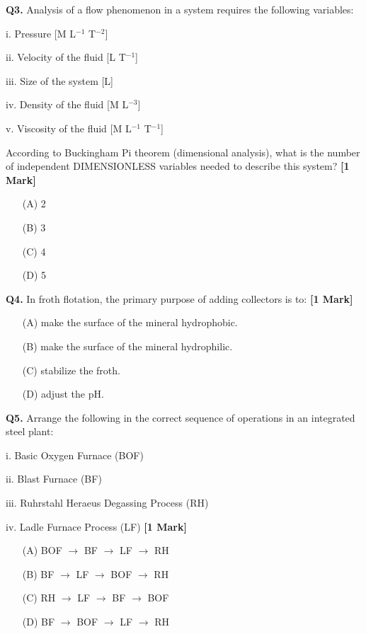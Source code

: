 \documentclass[11pt]{article}
\newcommand{\questiona}[2]{
    \noindent\textbf{Q#2.} #1 \hfill \textbf{[1 Mark]}
}
\begin{document}
\questiona{Analysis of a flow phenomenon in a system requires the following variables:  

i. Pressure [M L\(^{-1}\) T\(^{-2}\)]  

ii. Velocity of the fluid [L T\(^{-1}\)]  

iii. Size of the system [L]  

iv. Density of the fluid [M L\(^{-3}\)]  

v. Viscosity of the fluid [M L\(^{-1}\) T\(^{-1}\)]  

According to Buckingham Pi theorem (dimensional analysis), what is the number of independent DIMENSIONLESS variables needed to describe this system?}{3}
\begin{enumerate}
    \item[(A)] 2  
    \item[(B)] 3  
    \item[(C)] 4  
    \item[(D)] 5  
\end{enumerate}
\vspace{0.5cm}

\questiona{In froth flotation, the primary purpose of adding collectors is to:}{4}
\begin{enumerate}
    \item[(A)] make the surface of the mineral hydrophobic.  
    \item[(B)] make the surface of the mineral hydrophilic.  
    \item[(C)] stabilize the froth.  
    \item[(D)] adjust the pH.  
\end{enumerate}
\vspace{0.5cm}

\questiona{Arrange the following in the correct sequence of operations in an integrated steel plant:

i. Basic Oxygen Furnace (BOF)  

ii. Blast Furnace (BF)  

iii. Ruhrstahl Heraeus Degassing Process (RH)  

iv. Ladle Furnace Process (LF)}{5}
\begin{enumerate}
    \item[(A)] BOF \(\rightarrow\) BF \(\rightarrow\) LF \(\rightarrow\) RH  
    \item[(B)] BF \(\rightarrow\) LF \(\rightarrow\) BOF \(\rightarrow\) RH  
    \item[(C)] RH \(\rightarrow\) LF \(\rightarrow\) BF \(\rightarrow\) BOF  
    \item[(D)] BF \(\rightarrow\) BOF \(\rightarrow\) LF \(\rightarrow\) RH  
\end{enumerate}
\vspace{0.5cm}
\end{document}
